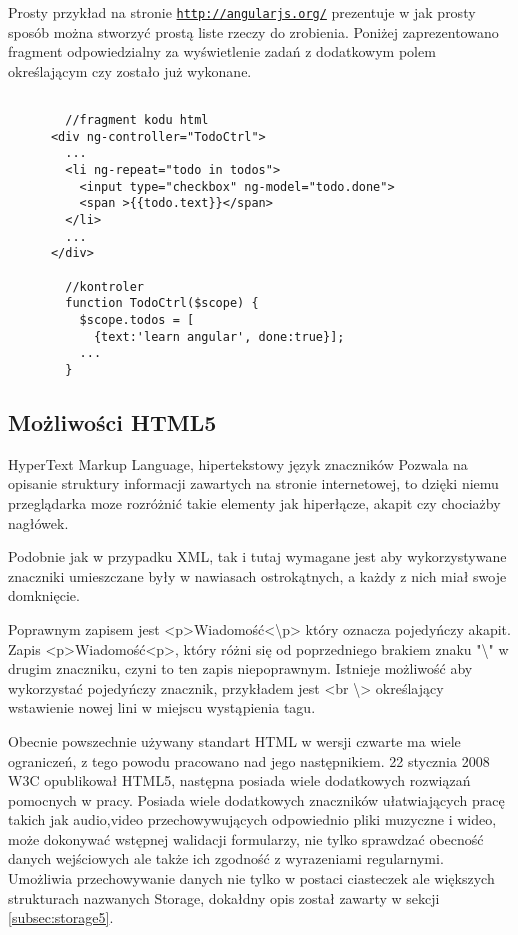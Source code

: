 Prosty przykład na stronie \underline{\texttt{http://angularjs.org/}} prezentuje w jak prosty sposób można stworzyć prostą liste rzeczy do zrobienia. Poniżej zaprezentowano fragment odpowiedzialny za wyświetlenie zadań z dodatkowym polem określającym czy zostało już wykonane.

\lstset{language=JavaScript}
\begin{lstlisting}[caption=AngularJs]

        //fragment kodu html
      <div ng-controller="TodoCtrl">
        ...
        <li ng-repeat="todo in todos">
          <input type="checkbox" ng-model="todo.done">
          <span >{{todo.text}}</span>
        </li>
        ...
      </div>

        //kontroler
        function TodoCtrl($scope) {
          $scope.todos = [
            {text:'learn angular', done:true}];
          ...
        }
\end{lstlisting}

\subsection{Możliwości HTML5}
\label{sec:html5}
\nocite{xml50}
\nocite{proxml}
\nocite{pre1}
\nocite{pre2}
\nocite{googlemapsbegin}
\nocite{proHTML5}
HyperText Markup Language,  hipertekstowy język znaczników
Pozwala na opisanie struktury informacji zawartych na stronie internetowej, to dzięki niemu przeglądarka moze rozróżnić takie elementy jak hiperłącze, akapit czy chociażby nagłówek.

Podobnie jak w przypadku XML, tak i tutaj wymagane jest aby wykorzystywane znaczniki umieszczane były w nawiasach ostrokątnych, a każdy z nich miał swoje domknięcie.

Poprawnym zapisem jest <p>Wiadomość<\textbackslash p> który oznacza pojedyńczy akapit. Zapis <p>Wiadomość<p>, który różni się od poprzedniego brakiem znaku "\textbackslash" w drugim znaczniku, czyni to ten zapis niepoprawnym. Istnieje możliwość aby wykorzystać pojedyńczy znacznik, przykładem jest <br \textbackslash> określający wstawienie nowej lini w miejscu wystąpienia tagu.

Obecnie powszechnie używany standart HTML w wersji czwarte ma wiele ograniczeń, z tego powodu pracowano nad jego następnikiem. 22 stycznia 2008 W3C opublikował HTML5, następna posiada wiele dodatkowych rozwiązań pomocnych w pracy. Posiada wiele dodatkowych znaczników ułatwiających pracę takich jak audio,video przechowywujących odpowiednio pliki muzyczne i wideo, może dokonywać wstępnej walidacji formularzy, nie tylko sprawdzać obecność danych wejściowych ale także ich zgodność z wyrazeniami regularnymi. Umożliwia przechowywanie danych nie tylko w postaci ciasteczek ale większych strukturach nazwanych Storage, dokałdny opis został zawarty w sekcji  \ref{subsec:storage5}.


